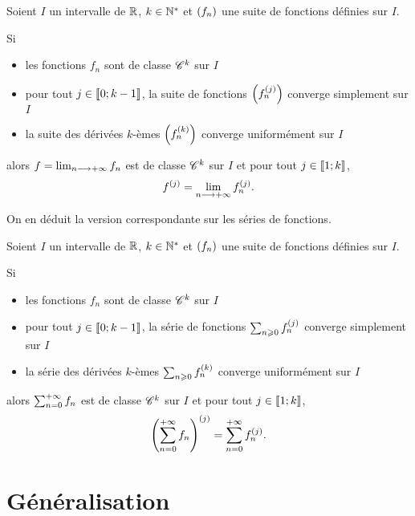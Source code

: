 \begin{theo}
Soient \(I\) un intervalle de \(\mathbb{R}\), \(k\in\mathbb{N}^*\) et \(\left(f_n\right)\) une suite de fonctions définies sur \(I\).

Si

\begin{itemize}
    \item les fonctions \(f_n\) sont de classe \(\mathscr{C}^{k}\) sur \(I\) \\
    \item pour tout \(j\in\left\llbracket0;k-1\right\rrbracket\), la suite de fonctions \(\left(f_n^{\left(j\right)}\right)\) converge simplement sur \(I\) \\
    \item la suite des dérivées \(k\)-èmes \(\left(f_n^{\left(k\right)}\right)\) converge uniformément sur \(I\)
\end{itemize}

alors \(f=\lim_{n\longrightarrow+\infty}f_n\) est de classe \(\mathscr{C}^{k}\) sur \(I\) et pour tout \(j\in\left\llbracket1;k\right\rrbracket\), \[f^{\left(j\right)}=\lim_{n\longrightarrow+\infty}f_n^{\left(j\right)}.\]
\end{theo}

On en déduit la version correspondante sur les séries de fonctions.

\begin{cor}
Soient \(I\) un intervalle de \(\mathbb{R}\), \(k\in\mathbb{N}^*\) et \(\left(f_n\right)\) une suite de fonctions définies sur \(I\).

Si

\begin{itemize}
    \item les fonctions \(f_n\) sont de classe \(\mathscr{C}^{k}\) sur \(I\) \\
    \item pour tout \(j\in\left\llbracket0;k-1\right\rrbracket\), la série de fonctions \(\sum_{n\geqslant0}f_n^{\left(j\right)}\) converge simplement sur \(I\) \\
    \item la série des dérivées \(k\)-èmes \(\sum_{n\geqslant0}f_n^{\left(k\right)}\) converge uniformément sur \(I\)
\end{itemize}

alors \(\sum_{n=0}^{+\infty}f_n\) est de classe \(\mathscr{C}^{k}\) sur \(I\) et pour tout \(j\in\left\llbracket1;k\right\rrbracket\), \[\left(\sum_{n=0}^{+\infty}f_n\right)^{\left(j\right)}=\sum_{n=0}^{+\infty}f_n^{\left(j\right)}.\]
\end{cor}

\section{Généralisation}

